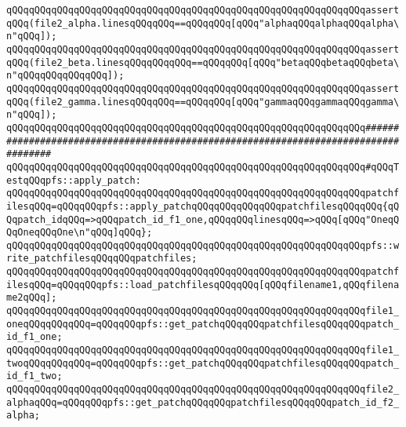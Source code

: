 \newline
\verb|qQQqqQQqqQQqqQQqqQQqqQQqqQQqqQQqqQQqqQQqqQQqqQQqqQQqqQQqqQQqqQQqassertqQQq(file2_alpha.linesqQQqqQQq==qQQqqQQq[qQQq"alphaqQQqalphaqQQqalpha\n"qQQq]);|\newline
\verb|qQQqqQQqqQQqqQQqqQQqqQQqqQQqqQQqqQQqqQQqqQQqqQQqqQQqqQQqqQQqqQQqassertqQQq(file2_beta.linesqQQqqQQqqQQq==qQQqqQQq[qQQq"betaqQQqbetaqQQqbeta\n"qQQqqQQqqQQqqQQq]);|\newline
\verb|qQQqqQQqqQQqqQQqqQQqqQQqqQQqqQQqqQQqqQQqqQQqqQQqqQQqqQQqqQQqqQQqassertqQQq(file2_gamma.linesqQQqqQQq==qQQqqQQq[qQQq"gammaqQQqgammaqQQqgamma\n"qQQq]);|\newline
\newline
\newline
\newline
\verb|qQQqqQQqqQQqqQQqqQQqqQQqqQQqqQQqqQQqqQQqqQQqqQQqqQQqqQQqqQQqqQQq####################################################################################|\newline
\verb|qQQqqQQqqQQqqQQqqQQqqQQqqQQqqQQqqQQqqQQqqQQqqQQqqQQqqQQqqQQqqQQq#qQQqTestqQQqpfs::apply_patch:|\newline
\newline
\verb|qQQqqQQqqQQqqQQqqQQqqQQqqQQqqQQqqQQqqQQqqQQqqQQqqQQqqQQqqQQqqQQqpatchfilesqQQq=qQQqqQQqpfs::apply_patchqQQqqQQqqQQqqQQqpatchfilesqQQqqQQq{qQQqpatch_idqQQq=>qQQqpatch_id_f1_one,qQQqqQQqlinesqQQq=>qQQq[qQQq"OneqQQqOneqQQqOne\n"qQQq]qQQq};|\newline
\newline
\verb|qQQqqQQqqQQqqQQqqQQqqQQqqQQqqQQqqQQqqQQqqQQqqQQqqQQqqQQqqQQqqQQqpfs::write_patchfilesqQQqqQQqpatchfiles;|\newline
\newline
\verb|qQQqqQQqqQQqqQQqqQQqqQQqqQQqqQQqqQQqqQQqqQQqqQQqqQQqqQQqqQQqqQQqpatchfilesqQQq=qQQqqQQqpfs::load_patchfilesqQQqqQQq[qQQqfilename1,qQQqfilename2qQQq];|\newline
\newline
\verb|qQQqqQQqqQQqqQQqqQQqqQQqqQQqqQQqqQQqqQQqqQQqqQQqqQQqqQQqqQQqqQQqfile1_oneqQQqqQQqqQQq=qQQqqQQqpfs::get_patchqQQqqQQqpatchfilesqQQqqQQqpatch_id_f1_one;|\newline
\verb|qQQqqQQqqQQqqQQqqQQqqQQqqQQqqQQqqQQqqQQqqQQqqQQqqQQqqQQqqQQqqQQqfile1_twoqQQqqQQqqQQq=qQQqqQQqpfs::get_patchqQQqqQQqpatchfilesqQQqqQQqpatch_id_f1_two;|\newline
\newline
\verb|qQQqqQQqqQQqqQQqqQQqqQQqqQQqqQQqqQQqqQQqqQQqqQQqqQQqqQQqqQQqqQQqfile2_alphaqQQq=qQQqqQQqpfs::get_patchqQQqqQQqpatchfilesqQQqqQQqpatch_id_f2_alpha;|\newline
